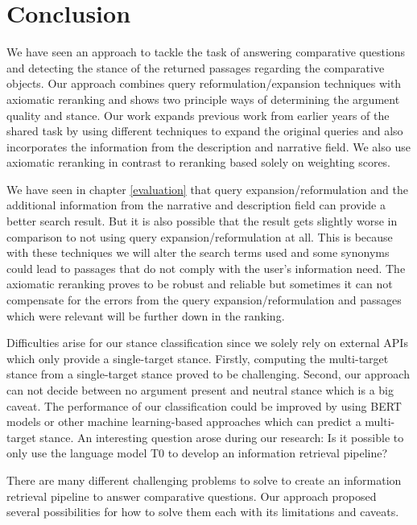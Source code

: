 \section{Conclusion}
    We have seen an approach to tackle the task of answering comparative questions and detecting the stance of the returned passages regarding the comparative objects. Our approach combines query reformulation/expansion techniques with axiomatic reranking and shows two principle ways of determining the argument quality and stance. Our work expands previous work from earlier years of the shared task by using different techniques to expand the original queries and also incorporates the information from the description and narrative field. We also use axiomatic reranking in contrast to reranking based solely on weighting scores.\par
    We have seen in chapter \ref{evaluation} that query expansion/reformulation and the additional information from the narrative and description field can provide a better search result. But it is also possible that the result gets slightly worse in comparison to not using query expansion/reformulation at all. This is because with these techniques we will alter the search terms used and some synonyms could lead to passages that do not comply with the user's information need. The axiomatic reranking proves to be robust and reliable but sometimes it can not compensate for the errors from the query expansion/reformulation and passages which were relevant will be further down in the ranking.\par 
    Difficulties arise for our stance classification since we solely rely on external APIs which only provide a single-target stance. Firstly, computing the multi-target stance from a single-target stance proved to be challenging. Second, our approach can not decide between no argument present and neutral stance which is a big caveat. The performance of our classification could be improved by using BERT models or other machine learning-based approaches which can predict a multi-target stance. An interesting question arose during our research: Is it possible to only use the language model T0 to develop an information retrieval pipeline?\par
    There are many different challenging problems to solve to create an information retrieval pipeline to answer comparative questions. Our approach proposed several possibilities for how to solve them each with its limitations and caveats.